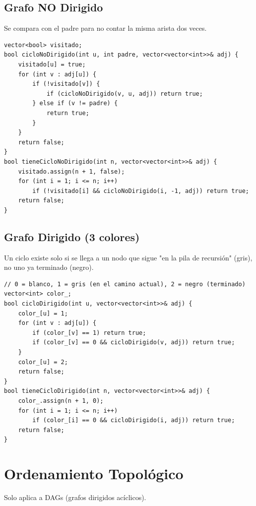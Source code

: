 \documentclass[10pt,twocolumn,letterpaper]{report}
\begin{document}
\subsection{Grafo NO Dirigido}
Se compara con el padre para no contar la misma arista dos veces.
\begin{lstlisting}
vector<bool> visitado;
bool cicloNoDirigido(int u, int padre, vector<vector<int>>& adj) {
    visitado[u] = true;
    for (int v : adj[u]) {
        if (!visitado[v]) {
            if (cicloNoDirigido(v, u, adj)) return true;
        } else if (v != padre) {
            return true;
        }
    }
    return false;
}
bool tieneCicloNoDirigido(int n, vector<vector<int>>& adj) {
    visitado.assign(n + 1, false);
    for (int i = 1; i <= n; i++)
        if (!visitado[i] && cicloNoDirigido(i, -1, adj)) return true;
    return false;
}
\end{lstlisting}

\subsection{Grafo Dirigido (3 colores)}
Un ciclo existe solo si se llega a un nodo que sigue "en la pila de recursión" (gris), no uno ya terminado (negro).
\begin{lstlisting}
// 0 = blanco, 1 = gris (en el camino actual), 2 = negro (terminado)
vector<int> color_;
bool cicloDirigido(int u, vector<vector<int>>& adj) {
    color_[u] = 1;
    for (int v : adj[u]) {
        if (color_[v] == 1) return true;
        if (color_[v] == 0 && cicloDirigido(v, adj)) return true;
    }
    color_[u] = 2;
    return false;
}
bool tieneCicloDirigido(int n, vector<vector<int>>& adj) {
    color_.assign(n + 1, 0);
    for (int i = 1; i <= n; i++)
        if (color_[i] == 0 && cicloDirigido(i, adj)) return true;
    return false;
}
\end{lstlisting}

\section{Ordenamiento Topológico}
Solo aplica a DAGs (grafos dirigidos acíclicos).
\end{document}
